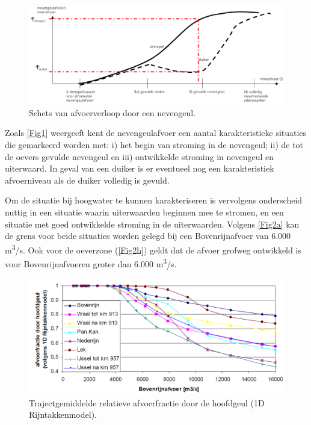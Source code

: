 \begin{figure}
\includegraphics[width=\columnwidth]{figures/Fig1.png}
\caption{Schets van afvoerverloop door een nevengeul.}
\label{Fig1}
\end{figure}

Zoals \autoref{Fig1} weergeeft kent de nevengeulafvoer een aantal karakteristieke situaties die gemarkeerd worden met: i) het begin van stroming in de nevengeul; ii) de tot de oevers gevulde nevengeul en iii) ontwikkelde stroming in nevengeul en uiterwaard.
In geval van een duiker is er eventueel nog een karakteristiek afvoerniveau als de duiker volledig is gevuld.

Om de situatie bij hoogwater te kunnen karakteriseren is vervolgens onderscheid nuttig in een situatie waarin uiterwaarden beginnen mee te stromen, en een situatie met goed ontwikkelde stroming in de uiterwaarden.
Volgens \autoref{Fig2a} kan de grens voor beide situaties worden gelegd bij een Bovenrijnafvoer van 6.000 m\textsuperscript{3}/s.
Ook voor de oeverzone (\autoref{Fig2b}) geldt dat de afvoer grofweg ontwikkeld is voor Bovenrijnafvoeren groter dan
6.000 m\textsuperscript{3}/s.

\begin{figure}
\includegraphics[width=\columnwidth]{figures/Fig2a.png}
\caption{Trajectgemiddelde relatieve afvoerfractie door de hoofdgeul (1D Rijntakkenmodel).}
\label{Fig2a}
\end{figure}

